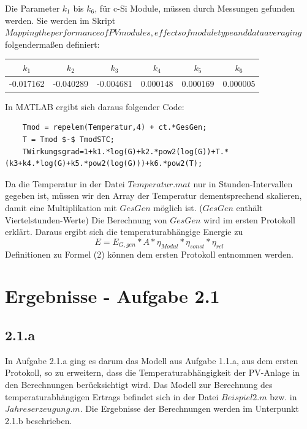 \documentclass[a4paper,12pt]{article}
\begin{document}
	Die Parameter $k_1$ bis $k_6$, für c-Si Module, müssen durch Messungen gefunden werden. Sie werden im Skript $Mapping the performance of PV modules, effects of module type and data averaging$ folgendermaßen definiert:
	\begin{table}[H]
		\centering
		\begin{tabular}{|l|c|c|c|c|c|}
			\hline
			\multicolumn{1}{|c|}{$k_1$} & $k_2$     & $k_3$     & $k_4$    & $k_5$    & $k_6$    \\ \hline
			-0.017162                   & -0.040289 & -0.004681 & 0.000148 & 0.000169 & 0.000005 \\ \hline
		\end{tabular}
	\end{table}
	In MATLAB ergibt sich daraus folgender Code:
	\begin{lstlisting}
	Tmod = repelem(Temperatur,4) + ct.*GesGen;
	T = Tmod $-$ TmodSTC;
	TWirkungsgrad=1+k1.*log(G)+k2.*pow2(log(G))+T.*(k3+k4.*log(G)+k5.*pow2(log(G)))+k6.*pow2(T);
	\end{lstlisting}
	Da die Temperatur in der Datei $Temperatur.mat$ nur in Stunden-Intervallen gegeben ist, müssen wir den Array der Temperatur dementsprechend skalieren, damit eine Multiplikation mit $GesGen$ möglich ist. ($GesGen$ enthält Viertelstunden-Werte)\newline
	Die Berechnung von $GesGen$ wird im ersten Protokoll erklärt.\newline
	Daraus ergibt sich die temperaturabhängige Energie zu
	\begin{equation}
	E=E_{G,gen}*A*\eta_{Modul}*\eta_{sonst}*\eta_{rel}
	\end{equation}
	Definitionen zu Formel (2) können dem ersten Protokoll entnommen werden.
	\newpage	
	\section{Ergebnisse - Aufgabe 2.1}
	\subsection{2.1.a}
	In Aufgabe 2.1.a ging es darum das Modell aus Aufgabe 1.1.a, aus dem ersten Protokoll, so zu erweitern, dass die Temperaturabhängigkeit der PV-Anlage in den Berechnungen berücksichtigt wird.\newline
	Das Modell zur Berechnung des temperaturabhängigen Ertrags befindet sich in der Datei $Beispiel2.m$ bzw. in $Jahreserzeugung.m$. Die Ergebnisse der Berechnungen werden im Unterpunkt 2.1.b beschrieben. 
\end{document}
